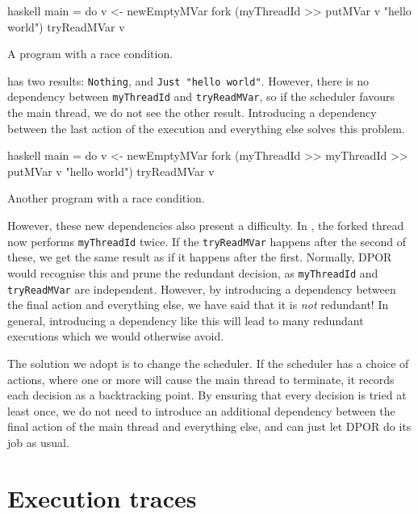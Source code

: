 \begin{listing}
\centering
\begin{cminted}{haskell}
main = do
  v <- newEmptyMVar
  fork (myThreadId >> putMVar v "hello world")
  tryReadMVar v
\end{cminted}
\caption{A program with a race condition.}\label{lst:daemon1}
\end{listing}

 has two results: \verb|Nothing|, and
\verb|Just "hello world"|.  However, there is no dependency between
\verb|myThreadId| and \verb|tryReadMVar|, so if the scheduler favours
the main thread, we do not see the other result.  Introducing a
dependency between the last action of the execution and everything
else solves this problem.

\begin{listing}
\centering
\begin{cminted}{haskell}
main = do
  v <- newEmptyMVar
  fork (myThreadId >> myThreadId >> putMVar v "hello world")
  tryReadMVar v
\end{cminted}
\caption{Another program with a race condition.}\label{lst:daemon2}
\end{listing}

However, these new dependencies also present a difficulty.  In
, the forked thread now performs \verb|myThreadId|
twice.  If the \verb|tryReadMVar| happens after the second of these,
we get the same result as if it happens after the first.  Normally,
DPOR would recognise this and prune the redundant decision, as
\verb|myThreadId| and \verb|tryReadMVar| are independent.  However, by
introducing a dependency between the final action and everything else,
we have said that it is \emph{not} redundant!  In general, introducing
a dependency like this will lead to many redundant executions which we
would otherwise avoid.

The solution we adopt is to change the scheduler.  If the scheduler
has a choice of actions, where one or more will cause the main thread
to terminate, it records each decision as a backtracking point.  By
ensuring that every decision is tried at least once, we do not need to
introduce an additional dependency between the final action of the
main thread and everything else, and can just let DPOR do its job as
usual.

\section{Execution traces}
\label{sec:dejafu-traces}

